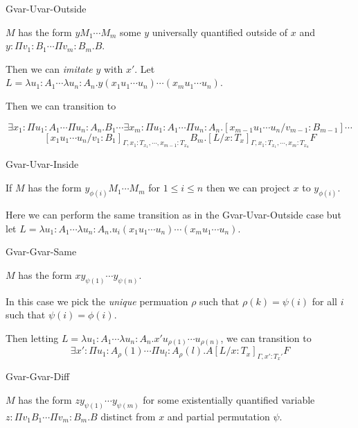 \begin{tcase}
Gvar-Uvar-Outside
\end{tcase}

$M$ has the form 
$y M_1 \cdots M_m$ some $y$ universally
quantified outside of $x$
and 
$y : \Pi v_1 : B_1 \cdots \Pi v_m : B_m . B$.  

Then we can \textit{imitate} $y$ with $x'$.
Let 
$L = \lambda u_1 : A_1 \cdots \lambda u_n : A_n .
 y (x_1 u_1 \cdots u_n) \cdots (x_m u_1 \cdots u_n)$.

Then we can transition to 

\[
\exists x_1 : \Pi u_1 : A_1 \cdots \Pi u_n : A_n . B_1 \cdots 
\exists x_m : \Pi u_1 : A_1 \cdots \Pi u_n : A_n . 
[x_{m-1}u_1\cdots u_n / v_{m-1} : B_{m-1}]
\cdots 
\]
\[
[x_1 u_1 \cdots u_n / v_1 : B_1]_{\Gamma, x_1:T_{x_1},\cdots, x_{m-1}:T_{x_n}} B_m .
[L / x : T_x ]_{\Gamma, x_1:T_{x_1},\cdots, x_m:T_{x_n}}F
\]

\begin{tcase}
Gvar-Uvar-Inside
\end{tcase}

If $M$ has the form 
$y_{\phi(i)} M_1 \cdots M_m$ for 
$1 \leq i \leq n$ then we can project $x$ to $y_{\phi(i)}$.

Here we can perform the same transition as in the Gvar-Uvar-Outside
case but let 
$L = \lambda u_1 : A_1 \cdots \lambda u_n : A_n .
 u_i (x_1 u_1 \cdots u_n) \cdots (x_m u_1 \cdots u_n)$.

\begin{tcase}
Gvar-Gvar-Same
\end{tcase}

$M$ has the form 
$x y_{\psi(1)} \cdots y_{\psi(n)}$.

In this case we pick the \textit{unique} permuation $\rho$ 
such that $\rho(k) = \psi(i)$ for all $i$ such that $\psi(i) = \phi(i)$.

Then letting
$L = \lambda u_1 : A_1 \cdots \lambda u_n : A_n .
 x' u_{\rho(1)} \cdots u_{\rho(n)} $, 
we can transition to
\[
\exists x' : \Pi u_1 : A_\rho(1) \cdots \Pi u_l : A_\rho(l) . A 
[L / x : T_x ]_{\Gamma, x' : T_x'} F
\] 


\begin{tcase}
Gvar-Gvar-Diff
\end{tcase}


$M$ has the form $z y_{\psi(1)} \cdots y_{\psi(m)}$
for some existentially quantified variable $z : \Pi v_1 B_1 \cdots \Pi v_m : B_m . B$ 
distinct from $x$ and partial permutation $\psi$. 

